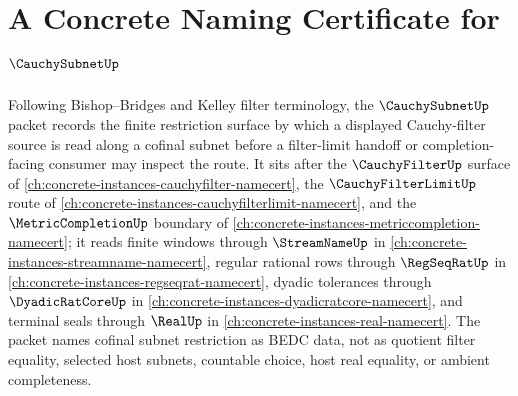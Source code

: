 \chapter{A Concrete Naming Certificate for $\CauchySubnetUp$}
\label{ch:concrete-instances-cauchy-subnet-namecert}

Following Bishop--Bridges and Kelley filter terminology, the $\CauchySubnetUp$ packet records the finite restriction surface by which a displayed Cauchy-filter source is read along a cofinal subnet before a filter-limit handoff or completion-facing consumer may inspect the route. It sits after the $\CauchyFilterUp$ surface of \autoref{ch:concrete-instances-cauchyfilter-namecert}, the $\CauchyFilterLimitUp$ route of \autoref{ch:concrete-instances-cauchyfilterlimit-namecert}, and the $\MetricCompletionUp$ boundary of \autoref{ch:concrete-instances-metriccompletion-namecert}; it reads finite windows through $\StreamNameUp$ in \autoref{ch:concrete-instances-streamname-namecert}, regular rational rows through $\RegSeqRatUp$ in \autoref{ch:concrete-instances-regseqrat-namecert}, dyadic tolerances through $\DyadicRatCoreUp$ in \autoref{ch:concrete-instances-dyadicratcore-namecert}, and terminal seals through $\RealUp$ in \autoref{ch:concrete-instances-real-namecert}. The packet names cofinal subnet restriction as BEDC data, not as quotient filter equality, selected host subnets, countable choice, host real equality, or ambient completeness.

